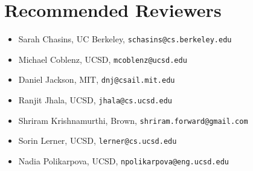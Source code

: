 \section*{Recommended Reviewers}

\begin{itemize}
  \item Sarah Chasins, UC Berkeley, \texttt{schasins@cs.berkeley.edu}
  \item Michael Coblenz, UCSD, \texttt{mcoblenz@ucsd.edu}
  \item Daniel Jackson, MIT, \texttt{dnj@csail.mit.edu}
  \item Ranjit Jhala, UCSD, \texttt{jhala@cs.ucsd.edu}
  \item Shriram Krishnamurthi, Brown, \texttt{shriram.forward@gmail.com}
  \item Sorin Lerner, UCSD, \texttt{lerner@cs.ucsd.edu}
  \item Nadia Polikarpova, UCSD, \texttt{npolikarpova@eng.ucsd.edu}
\end{itemize}